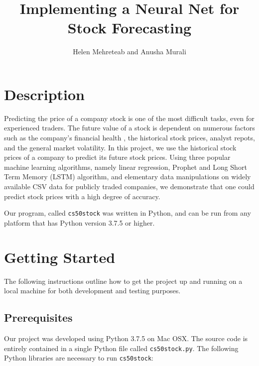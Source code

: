 \documentclass[12pt, oneside]{article}   	%
\title{Implementing a Neural Net for Stock Forecasting}
\author{Helen Mehreteab and Anusha Murali}
\begin{document}
\maketitle
\section{Description}

Predicting the price of a company stock is one of the most difficult tasks, even for experienced traders. The future value of a stock is dependent on numerous factors such as the company's financial health , the historical stock prices, analyst repots, and the general market volatility.  In this project, we use the historical stock prices of a company to predict its future stock prices. Using three popular machine learning algorithms, namely linear regression, Prophet and Long Short Term Memory (LSTM) algorithm, and elementary data manipulations on widely available CSV data for publicly traded companies,  we demonstrate that one could predict stock prices with a high degree of accuracy.

Our program, called {\tt cs50stock} was written in Python, and can be run from any platform that has Python version 3.7.5 or higher.

\section{Getting Started}
The following instructions outline how to get the project up and running on a local machine for both development and testing purposes.

\subsection{Prerequisites}

Our project was developed using Python 3.7.5 on Mac OSX. The source code is entirely contained in a single Python file called {\tt cs50stock.py}.  The following Python libraries are necessary to run {\tt cs50stock}:
\end{document}

